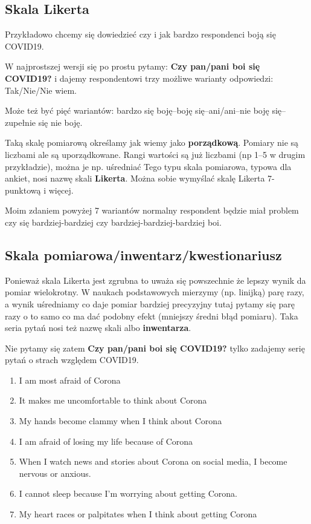 \documentclass[
  openany]{book}
\begin{document}
\hypertarget{skala-likerta}{%
\subsection{Skala Likerta}\label{skala-likerta}}

Przykładowo chcemy się dowiedzieć czy i jak bardzo respondenci boją się COVID19.

W najprostszej wersji się po prostu pytamy:
\textbf{Czy pan/pani boi się COVID19?} i dajemy
respondentowi trzy możliwe warianty odpowiedzi: Tak/Nie/Nie wiem.

Może też być pięć wariantów: bardzo się boję--boję się--ani/ani--nie boję się--zupełnie się nie boję.

Taką skalę pomiarową określamy jak wiemy jako \textbf{porządkową}. Pomiary nie są liczbami
ale są uporządkowane.
Rangi wartości są już liczbami (np 1--5 w drugim przykładzie), można je np. uśredniać
Tego typu skala pomiarowa, typowa dla ankiet, nosi nazwę skali \textbf{Likerta}.
Można sobie wymyślać skalę Likerta 7-punktową i więcej.

Moim zdaniem powyżej 7 wariantów normalny respondent będzie miał problem
czy się bardziej-bardziej czy bardziej-bardziej-bardziej boi.

\hypertarget{skala-pomiarowainwentarzkwestionariusz}{%
\subsection{Skala pomiarowa/inwentarz/kwestionariusz}\label{skala-pomiarowainwentarzkwestionariusz}}

Ponieważ skala Likerta jest zgrubna to
uważa się powszechnie że lepszy wynik da pomiar
wielokrotny.
W naukach podstawowych mierzymy (np. linijką) parę razy, a wynik uśredniamy co daje pomiar bardziej
precyzyjny tutaj pytamy się parę razy o to samo co
ma dać podobny efekt (mniejszy średni błąd pomiaru).
Taka seria pytań nosi też nazwę skali albo \textbf{inwentarza}.

Nie pytamy się zatem \textbf{Czy pan/pani boi się COVID19?} tylko zadajemy serię
pytań o strach względem COVID19.

\begin{enumerate}
\def\labelenumi{\arabic{enumi}.}
\item
  I am most afraid of Corona
\item
  It makes me uncomfortable to think about Corona
\item
  My hands become clammy when I think about Corona
\item
  I am afraid of losing my life because of Corona
\item
  When I watch news and stories about Corona on social media, I become nervous or anxious.
\item
  I cannot sleep because I'm worrying about getting Corona.
\item
  My heart races or palpitates when I think about getting Corona
\end{enumerate}
\end{document}

